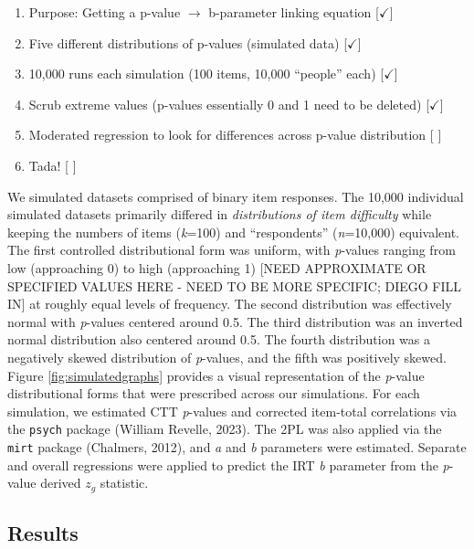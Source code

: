\documentclass[
  man]{apa6}
\providecommand{\tightlist}{%
  \setlength{\itemsep}{0pt}\setlength{\parskip}{0pt}}
\begin{document}
\begin{enumerate}
\def\labelenumi{\arabic{enumi}.}
\tightlist
\item
  Purpose: Getting a p-value \(\rightarrow\) b-parameter linking equation {[}\(\checkmark\){]}
\item
  Five different distributions of p-values (simulated data) {[}\(\checkmark\){]}
\item
  10,000 runs each simulation (100 items, 10,000 ``people'' each) {[}\(\checkmark\){]}\\
\item
  Scrub extreme values (p-values essentially 0 and 1 need to be deleted) {[}\(\checkmark\){]}
\item
  Moderated regression to look for differences across p-value distribution {[} {]}
\item
  Tada! {[} {]}
\end{enumerate}

We simulated datasets comprised of binary item responses. The 10,000 individual simulated datasets primarily differed in \emph{distributions of item difficulty} while keeping the numbers of items (\emph{k}=100) and ``respondents'' (\emph{n}=10,000) equivalent. The first controlled distributional form was uniform, with \emph{p}-values ranging from low (approaching 0) to high (approaching 1) {[}NEED APPROXIMATE OR SPECIFIED VALUES HERE - NEED TO BE MORE SPECIFIC; DIEGO FILL IN{]} at roughly equal levels of frequency. The second distribution was effectively normal with \emph{p}-values centered around 0.5. The third distribution was an inverted normal distribution also centered around 0.5. The fourth distribution was a negatively skewed distribution of \emph{p}-values, and the fifth was positively skewed. Figure \ref{fig:simulatedgraphs} provides a visual representation of the \emph{p}-value distributional forms that were prescribed across our simulations.
For each simulation, we estimated CTT \emph{p}-values and corrected item-total correlations via the \texttt{psych} package (William Revelle, 2023). The 2PL was also applied via the \texttt{mirt} package (Chalmers, 2012), and \emph{a} and \emph{b} parameters were estimated. Separate and overall regressions were applied to predict the IRT \emph{b} parameter from the \emph{p}-value derived \(z_g\) statistic.

\hypertarget{results}{%
\subsection{Results}\label{results}}
\end{document}
